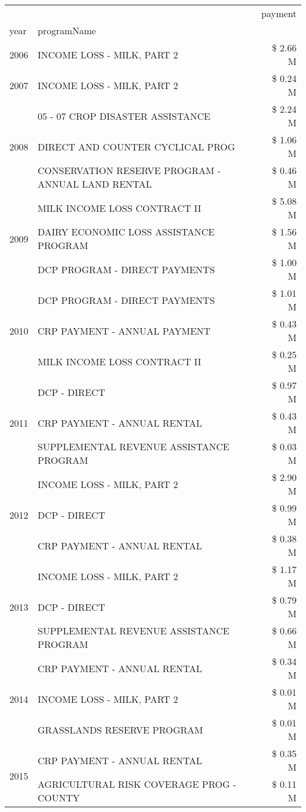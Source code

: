 \begin{tabular}{llr}
\toprule
 &  & payment \\
year & programName &  \\
\midrule
2006 & INCOME LOSS - MILK, PART 2 & \$ 2.66 M \\
\cline{1-3}
2007 & INCOME LOSS - MILK, PART 2 & \$ 0.24 M \\
\cline{1-3}
\multirow[t]{3}{*}{2008} & 05 - 07 CROP DISASTER ASSISTANCE & \$ 2.24 M \\
 & DIRECT AND COUNTER CYCLICAL PROG & \$ 1.06 M \\
 & CONSERVATION RESERVE PROGRAM - ANNUAL LAND RENTAL & \$ 0.46 M \\
\cline{1-3}
\multirow[t]{3}{*}{2009} & MILK INCOME LOSS CONTRACT II & \$ 5.08 M \\
 & DAIRY ECONOMIC LOSS ASSISTANCE PROGRAM & \$ 1.56 M \\
 & DCP PROGRAM - DIRECT PAYMENTS & \$ 1.00 M \\
\cline{1-3}
\multirow[t]{3}{*}{2010} & DCP PROGRAM - DIRECT PAYMENTS & \$ 1.01 M \\
 & CRP PAYMENT - ANNUAL PAYMENT & \$ 0.43 M \\
 & MILK INCOME LOSS CONTRACT II & \$ 0.25 M \\
\cline{1-3}
\multirow[t]{3}{*}{2011} & DCP - DIRECT & \$ 0.97 M \\
 & CRP PAYMENT - ANNUAL RENTAL & \$ 0.43 M \\
 & SUPPLEMENTAL REVENUE ASSISTANCE PROGRAM & \$ 0.03 M \\
\cline{1-3}
\multirow[t]{3}{*}{2012} & INCOME LOSS - MILK, PART 2 & \$ 2.90 M \\
 & DCP - DIRECT & \$ 0.99 M \\
 & CRP PAYMENT - ANNUAL RENTAL & \$ 0.38 M \\
\cline{1-3}
\multirow[t]{3}{*}{2013} & INCOME LOSS - MILK, PART 2 & \$ 1.17 M \\
 & DCP - DIRECT & \$ 0.79 M \\
 & SUPPLEMENTAL REVENUE ASSISTANCE PROGRAM & \$ 0.66 M \\
\cline{1-3}
\multirow[t]{3}{*}{2014} & CRP PAYMENT - ANNUAL RENTAL & \$ 0.34 M \\
 & INCOME LOSS - MILK, PART 2 & \$ 0.01 M \\
 & GRASSLANDS RESERVE PROGRAM & \$ 0.01 M \\
\cline{1-3}
\multirow[t]{3}{*}{2015} & CRP PAYMENT - ANNUAL RENTAL & \$ 0.35 M \\
 & AGRICULTURAL RISK COVERAGE PROG - COUNTY & \$ 0.11 M \\

\end{tabular}
